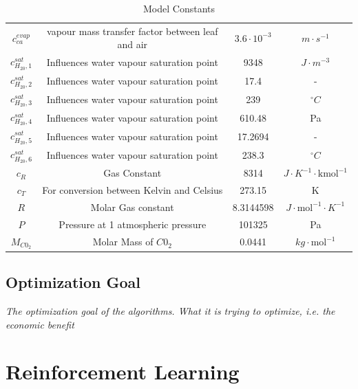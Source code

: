 \begin{table}[H]
\begin{tabular}{|c|c|c|c|}
		\\
		$c_{ca}^{evap}$&vapour mass transfer factor between leaf and air  & $3.6 \cdot 10^{-3}$ & $m \cdot s^{-1}$
		\\
		$c_{H_20,1}^{sat}$& Influences water vapour saturation point&9348 & $J \cdot m^{-3}$
		\\
		$c_{H_20,2}^{sat}$&Influences water vapour saturation point &17.4 & -
		\\
		$c_{H_20,3}^{sat}$& Influences water vapour saturation point&239 & $^\circ C$
		\\
		$c_{H_20,4}^{sat}$& Influences water vapour saturation point&610.48 & Pa
		\\
		$c_{H_20,5}^{sat}$&Influences water vapour saturation point &17.2694 & -
		\\
		$c_{H_20,6}^{sat}$& Influences water vapour saturation point&238.3 & $^\circ C$
		\\
		$c_R$& Gas Constant &8314 & $J \cdot K^{-1} \cdot \text{kmol}^{-1}$
		\\
		$c_T$& For conversion between Kelvin and Celsius &273.15 & K
		\\
		$R$&Molar Gas constant &8.3144598 &$J \cdot \text{mol}^{-1} \cdot K^{-1}$
		\\
		$P$&Pressure at 1 atmospheric pressure &101325 & Pa
		\\
		$M_{C0_2}$& Molar Mass of $C0_2$ &0.0441 & $kg \cdot \text{mol}^{-1}$
		\\
		\hline
	\end{tabular}
	\caption{Model Constants}
	\label{tab:model constants and descriptions}
\end{table}

\subsection{Optimization Goal}
\label{ssection:optimization-goal}
\emph{The optimization goal of the algorithms. What it is trying to optimize, i.e. the economic benefit}


\section{Reinforcement Learning}
